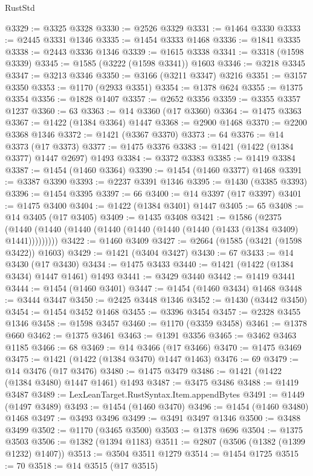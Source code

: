 \begin{lexlean}{RustStd}
\begin{coremodule}
@3329 := @3325 @3328
@3330 := @2526 @3329
@3331 := @1464 @3330
@3333 := @2445 @3331 @1346
@3335 := @1454 @3333 @1468
@3336 := @1841 @3335
@3338 := @2443 @3336 @1346
@3339 := @1615 @3338
@3341 := @3318 (@1598 @3339)
@3345 := @1585 (@3222 (@1598 @3341)) @1603
@3346 := @3218 @3345
@3347 := @3213 @3346
@3350 := @3166 (@3211 @3347) @3216
@3351 := @3157 @3350
@3353 := @1170 (@2933 @3351)
@3354 := @1378 @624
@3355 := @1375 @3354
@3356 := @1828 @1407
@3357 := @2652 @3356
@3359 := @3355 @3357 @1237
@3360 := 63
@3363 := @14 @3360 (@17 @3360)
@3364 := @1475 @3363
@3367 := @1422 (@1384 @3364) @1447
@3368 := @2900 @1468
@3370 := @2200 @3368 @1346
@3372 := @1421 (@3367 @3370)
@3373 := 64
@3376 := @14 @3373 (@17 @3373)
@3377 := @1475 @3376
@3383 := @1421 (@1422 (@1384 @3377) @1447 @2697) @1493
@3384 := @3372 @3383
@3385 := @1419 @3384
@3387 := @1454 (@1460 @3364)
@3390 := @1454 (@1460 @3377) @1468
@3391 := @3387 @3390
@3393 := @2237 @3391 @1346
@3395 := @1430 (@3385 @3393)
@3396 := @1454 @3395
@3397 := 66
@3400 := @14 @3397 (@17 @3397)
@3401 := @1475 @3400
@3404 := @1422 (@1384 @3401) @1447
@3405 := 65
@3408 := @14 @3405 (@17 @3405)
@3409 := @1435 @3408
@3421 := @1586
    (@2375 (@1440 (@1440 (@1440 (@1440 (@1440 (@1440 (@1440 (@1433 (@1384 @3409) @1441)))))))))
@3422 := @1460 @3409
@3427 := @2664 (@1585 (@3421 (@1598 @3422)) @1603)
@3429 := @1421 (@3404 @3427)
@3430 := 67
@3433 := @14 @3430 (@17 @3430)
@3434 := @1475 @3433
@3440 := @1421 (@1422 (@1384 @3434) @1447 @1461) @1493
@3441 := @3429 @3440
@3442 := @1419 @3441
@3444 := @1454 (@1460 @3401)
@3447 := @1454 (@1460 @3434) @1468
@3448 := @3444 @3447
@3450 := @2425 @3448 @1346
@3452 := @1430 (@3442 @3450)
@3454 := @1454 @3452 @1468
@3455 := @3396 @3454
@3457 := @2328 @3455 @1346
@3458 := @1598 @3457
@3460 := @1170 (@3359 @3458)
@3461 := @1378 @660
@3462 := @1375 @3461
@3463 := @1391 @3356
@3465 := @3462 @3463 @1185
@3466 := 68
@3469 := @14 @3466 (@17 @3466)
@3470 := @1475 @3469
@3475 := @1421 (@1422 (@1384 @3470) @1447 @1463)
@3476 := 69
@3479 := @14 @3476 (@17 @3476)
@3480 := @1475 @3479
@3486 := @1421 (@1422 (@1384 @3480) @1447 @1461) @1493
@3487 := @3475 @3486
@3488 := @1419 @3487
@3489 := LexLeanTarget.RustSyntax.Item.appendBytes
@3491 := @1449 (@1497 @3489)
@3493 := @1454 (@1460 @3470)
@3496 := @1454 (@1460 @3480) @1468
@3497 := @3493 @3496
@3499 := @3491 @3497 @1346
@3500 := @3488 @3499
@3502 := @1170 (@3465 @3500)
@3503 := @1378 @696
@3504 := @1375 @3503
@3506 := @1382 (@1394 @1183)
@3511 := @2807 (@3506 (@1382 (@1399 @1232) @1407))
@3513 := @3504 @3511 @1279
@3514 := @1454 @1725
@3515 := 70
@3518 := @14 @3515 (@17 @3515)

\end{coremodule}
\end{lexlean}
